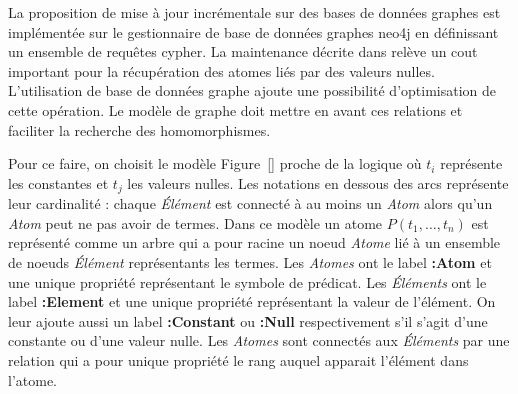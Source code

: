 La proposition de mise à jour incrémentale sur des bases de données graphes est implémentée sur le gestionnaire de base de données graphes \gls{neo4j} en définissant un ensemble de requêtes \gls{cypher}.
La maintenance décrite dans \cite{chabinConsistentUpdatingDatabases2020} relève un cout important pour la récupération des atomes liés par des valeurs nulles.
L'utilisation de base de données graphe ajoute une possibilité d'optimisation de cette opération.
Le modèle de graphe doit mettre en avant ces relations et faciliter la recherche des homomorphismes.

Pour ce faire, on choisit le modèle Figure~\ref{} proche de la logique où $t_i$ représente les constantes et $t_j$ les valeurs nulles.
Les notations en dessous des arcs représente leur cardinalité : chaque \textit{Élément} est connecté à au moins un \textit{Atom} alors qu'un \textit{Atom} peut ne pas avoir de termes.
Dans ce modèle un atome $P(t_1, \dots, t_n)$ est représenté comme un arbre qui a pour racine un noeud \textit{Atome} lié à un ensemble de noeuds \textit{Élément} représentants les termes.
Les \textit{Atomes} ont le label \textbf{:Atom} et une unique propriété représentant le symbole de prédicat.
Les \textit{Éléments} ont le label \textbf{:Element} et une unique propriété représentant la valeur de l'élément.
On leur ajoute aussi un label \textbf{:Constant} ou \textbf{:Null} respectivement s'il s'agit d'une constante ou d'une valeur nulle.
Les \textit{Atomes} sont connectés aux \textit{Éléments} par une relation qui a pour unique propriété le rang auquel apparait l'élément dans l'atome.
